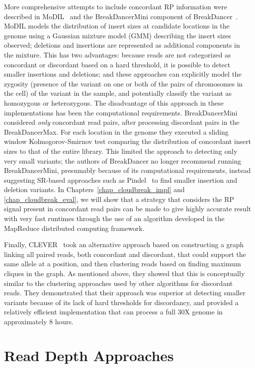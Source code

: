 More comprehensive attempts to include concordant RP information were described in MoDIL~\cite{Lee:2009da} and the BreakDancerMini component of BreakDancer~\cite{Chen:2009p3}. MoDIL models the distribution of insert sizes at candidate locations in the genome using a Gaussian mixture model (GMM) describing the insert sizes observed; deletions and insertions are represented as additional components in the mixture. This has two advantages: because reads are not categorized as concordant or discordant based on a hard threshold, it is possible to detect smaller insertions and deletions; and these approaches can explicitly model the zygosity (presence of the variant on one or both of the pairs of chromosomes in the cell) of the variant in the sample, and potentially classify the variant as homozygous or heterozygous. The disadvantage of this approach in these implementations has been the computational requirements. BreakDancerMini considered \emph{only} concordant read pairs, after processing discordant pairs in the BreakDancerMax. For each location in the genome they executed a sliding window Kolmogorov-Smirnov test comparing the distribution of concordant insert sizes to that of the entire library. This limited the approach to detecting only very small variants; the authors of BreakDancer no longer recommend running BreakDancerMini, presumably because of its computational requirements, instead suggesting SR-based approaches such as Pindel~\cite{Ye:2009p2} to find smaller insertion and deletion variants. In Chapters~\ref{chap_cloudbreak_impl} and \ref{chap_cloudbreak_eval}, we will show that a strategy that considers the RP signal present in concordant read pairs can be made to give highly accurate result with very fast runtimes through the use of an algorithm developed in the MapReduce distributed computing framework.

Finally, CLEVER~\cite{Marschall:2012ek} took an alternative approach based on constructing a graph linking all paired reads, both concordant and discordant, that could support the same allele at a position, and then clustering reads based on finding maximum cliques in the graph. As mentioned above, they showed that this is conceptually similar to the clustering approaches used by other algorithms for discordant reads. They demonstrated that their approach was superior at detecting smaller variants because of its lack of hard thresholds for discordancy, and provided a relatively efficient implementation that can process a full 30X genome in approximately 8 hours.

\section{Read Depth Approaches}

